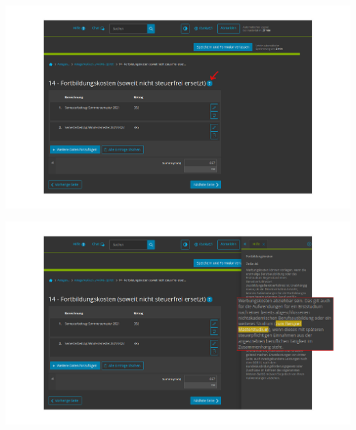 \documentclass{beamer}
\begin{document}
			\begin{frame}
				\begin{center}
					\vspace{-0.6cm}
					\hspace*{-0.91cm}
					\includegraphics[scale=0.24]{images/elster-fortbildungskosten-1}
				\end{center}
			\end{frame}
			
			\begin{frame}
				\begin{center}
					\vspace{-0.6cm}
					\hspace*{-0.91cm}
					\includegraphics[scale=0.24]{images/elster-fortbildungskosten-2}
				\end{center}
			\end{frame}
			
\end{document}
